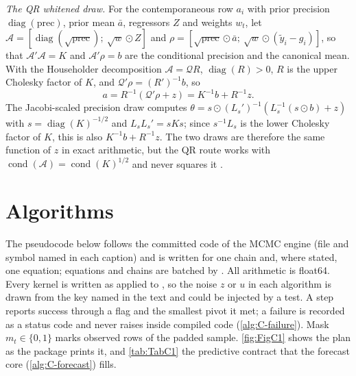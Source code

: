 \emph{The QR whitened draw.}
For the contemporaneous row $a_i$ with prior precision $\operatorname{diag}(\mathrm{prec})$, prior
mean $\bar a$, regressors $Z$ and weights $w_t$, let
$\mathcal{A} = [\operatorname{diag}(\sqrt{\mathrm{prec}});\ \sqrt{w}\odot Z]$ and $\rho =
[\sqrt{\mathrm{prec}}\odot\bar a;\ \sqrt{w}\odot(\tilde y_i - g_i)]$, so that $\mathcal{A}'\mathcal{A}
= K$ and $\mathcal{A}'\rho = b$ are the conditional precision and the canonical mean.
With the Householder decomposition $\mathcal{A} = \mathcal{Q}R$, $\operatorname{diag}(R) > 0$, $R$ is
the upper Cholesky factor of $K$, and $\mathcal{Q}'\rho = (R')^{-1}b$, so
\begin{equation}\label{eq:qr-draw}
a = R^{-1}(\mathcal{Q}'\rho + z) = K^{-1}b + R^{-1}z .
\end{equation}
The Jacobi-scaled precision draw computes $\theta = s\odot (L_s')^{-1}(L_s^{-1}(s\odot b) + z)$
with $s = \operatorname{diag}(K)^{-1/2}$ and $L_sL_s' = sKs$; since $s^{-1}L_s$ is the lower Cholesky
factor of $K$, this is also $K^{-1}b + R^{-1}z$.
The two draws are therefore the same function of $z$ in exact arithmetic, but the QR route works
with $\operatorname{cond}(\mathcal{A}) = \operatorname{cond}(K)^{1/2}$ and never squares it
\citep{higham2002accuracy,bjorck1996numerical}.

\section{Algorithms}\label{app:algorithms}

The pseudocode below follows the committed code of the MCMC engine (file and symbol named in each
caption) and is written for one chain and, where stated, one equation; equations and chains are
batched by .
All arithmetic is float64.
Every kernel is written as  applied to , so the
noise $z$ or $u$ in each algorithm is drawn from the key named in the text and could be injected by a
test.
A step reports success through a flag  and the smallest pivot it met; a failure is recorded
as a status code and never raises inside compiled code (\cref{alg:C-failure}).
Mask $m_t \in \{0, 1\}$ marks observed rows of the padded sample.
\cref{fig:FigC1} shows the plan as the package prints it, and \cref{tab:TabC1} the
predictive contract that the forecast core (\cref{alg:C-forecast}) fills.

